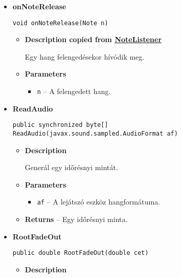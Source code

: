 {{{{{{{{{{{{{{\begin{itemize}
{\begin{itemize}
{Egy hang leütésekor hívódik meg.
}
\item{
{\bf  Parameters}
  \begin{itemize}
   \item{
\texttt{n} -- a leütött hang.}
  \end{itemize}
}%
\end{itemize}
}%
\item{ 
\hypertarget{main.OSC.onNoteRelease(main.Note)}{{\bf  onNoteRelease}\\}
\begin{lstlisting}[frame=none]
void onNoteRelease(Note n)\end{lstlisting} %
\begin{itemize}
\item{
{\bf  Description copied from \hyperlink{main.NoteListener}{NoteListener}{\small {}} }

Egy hang felengedésekor hívódik meg.
}
\item{
{\bf  Parameters}
  \begin{itemize}
   \item{
\texttt{n} -- A felengedett hang.}
  \end{itemize}
}%
\end{itemize}
}%
\item{ 
\hypertarget{main.OSC.ReadAudio(javax.sound.sampled.AudioFormat)}{{\bf  ReadAudio}\\}
\begin{lstlisting}[frame=none]
public synchronized byte[] ReadAudio(javax.sound.sampled.AudioFormat af)\end{lstlisting} %
\begin{itemize}
\item{
{\bf  Description}

Generál egy időrésnyi mintát.
}
\item{
{\bf  Parameters}
  \begin{itemize}
   \item{
\texttt{af} -- A lejátszó eszköz hangformátuma.}
  \end{itemize}
}%
\item{{\bf  Returns} -- 
Egy időrésnyi minta. 
}%
\end{itemize}
}%
\item{ 
\hypertarget{main.OSC.RootFadeOut(double)}{{\bf  RootFadeOut}\\}
\begin{lstlisting}[frame=none]
public double RootFadeOut(double cet)\end{lstlisting} %
\begin{itemize}
\item{
{\bf  Description}

}
\end{itemize}}
\end{itemize}}}}}}}}}}}}}}}
